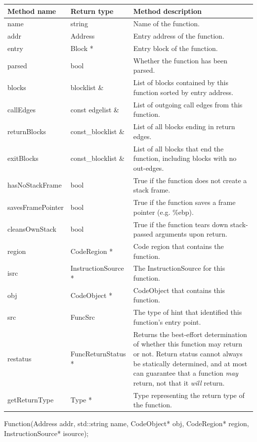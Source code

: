\begin{tabularx}{\textwidth}{llX}
\toprule
Method name & Return type & Method description \\
\midrule
name & string & Name of the function. \\
addr & Address & Entry address of the function.  \\
entry & Block * & Entry block of the function. \\
parsed & bool & Whether the function has been parsed. \\
blocks & blocklist \& & List of blocks contained by this function sorted by entry address. \\
callEdges & const edgelist \& & List of outgoing call edges from this function. \\
returnBlocks & const\_blocklist \& & List of all blocks ending in return edges. \\
exitBlocks & const\_blocklist \& & List of all blocks that end the function, including blocks with no out-edges. \\
hasNoStackFrame & bool & True if the function does not create a stack frame. \\
savesFramePointer & bool & True if the function saves a frame pointer (e.g. \%ebp). \\
cleansOwnStack & bool & True if the function tears down stack-passed arguments upon return. \\
region & CodeRegion * & Code region that contains the function. \\
isrc & InstructionSource * & The InstructionSource for this function. \\
obj & CodeObject * & CodeObject that contains this function. \\
src & FuncSrc & The type of hint that identified this function's entry point. \\
restatus & FuncReturnStatus * & Returns the best-effort determination of whether this function may return or not. Return status cannot always be statically determined, and at most can guarantee that a function \emph{may} return, not that it \emph{will} return. \\
getReturnType & Type * & Type representing the return type of the function. \\

\bottomrule
\end{tabularx}

\begin{apient}
Function(Address addr,
         std::string name,
         CodeObject* obj,
         CodeRegion* region,
         InstructionSource* isource);
\end{apient}

